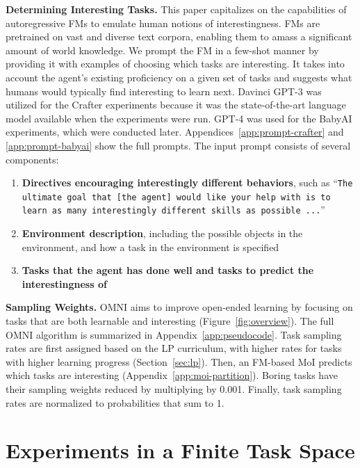 \documentclass{article} %
\begin{document}
\textbf{Determining Interesting Tasks.}
This paper capitalizes on the capabilities of autoregressive FMs to emulate human notions of interestingness. FMs are pretrained on vast and diverse text corpora, enabling them to amass a significant amount of world knowledge. We prompt the FM in a few-shot manner by providing it with examples of choosing which tasks are interesting. It takes into account the agent's existing proficiency on a given set of tasks and suggests what humans would typically find interesting to learn next. Davinci GPT-3 \citep{gpt3} was utilized for the Crafter experiments because it was the state-of-the-art language model available when the experiments were run. GPT-4 \citep{openai2023gpt4} was used for the BabyAI experiments, which were conducted later. Appendices~\ref{app:prompt-crafter} and \ref{app:prompt-babyai} show the full prompts. The input prompt consists of several components:
\begin{enumerate}
    \itemsep1pt
    \item \textbf{Directives encouraging interestingly different behaviors}, such as ``\texttt{The ultimate goal that [the agent] would like your help with is to learn as many interestingly different skills as possible ...}''
    \item \textbf{Environment description}, including the possible objects in the environment, and how a task in the environment is specified
    \item \textbf{Tasks that the agent has done well and tasks to predict the interestingness of}
\end{enumerate}

\textbf{Sampling Weights.}
OMNI aims to improve open-ended learning by focusing on tasks that are both learnable and interesting (Figure~\ref{fig:overview}). The full OMNI algorithm is summarized in Appendix~\ref{app:pseudocode}. Task sampling rates are first assigned based on the LP curriculum, with higher rates for tasks with higher learning progress (Section~\ref{sec:lp}). Then, an FM-based MoI predicts which tasks are interesting (Appendix~\ref{app:moi-partition}). Boring tasks have their sampling weights reduced by multiplying by 0.001. Finally, task sampling rates are normalized to probabilities that sum to 1.

\section{Experiments in a Finite Task Space}
\end{document}
